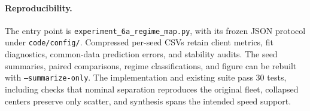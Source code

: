 \paragraph{Reproducibility.}
The entry point is \texttt{experiment\_6a\_regime\_map.py}, with its frozen JSON
protocol under \texttt{code/config/}. Compressed per-seed CSVs retain client
metrics, fit diagnostics, common-data prediction errors, and stability audits.
The seed summaries, paired comparisons, regime classifications, and figure
can be rebuilt with \texttt{--summarize-only}. The implementation and existing
suite pass 30 tests, including checks that nominal separation reproduces the
original fleet, collapsed centers preserve only scatter, and synthesis spans
the intended speed support.
